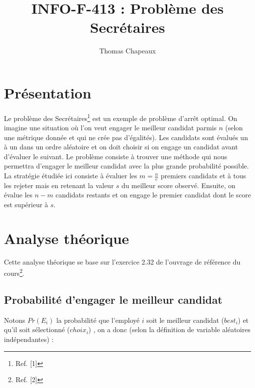 \documentclass[a4paper,10pt]{article}
\title{INFO-F-413 : Problème des Secrétaires}
\author{Thomas Chapeaux}
\begin{document}
\sloppy
\maketitle

\section{Présentation}

Le problème des Secrétaires\footnote{Ref. [1]} est un exemple de problème d'arrêt optimal. On imagine une situation où l'on veut engager
le meilleur candidat parmis
\begin{math}n\end{math}
(selon une métrique donnée et qui ne crée pas d'égalités). Les candidats sont évalués un à un dans un ordre aléatoire et on doit choisir si on engage un candidat
avant d'évaluer le suivant. Le problème consiste à trouver une méthode qui nous permettra d'engager le meilleur candidat avec
la plus grande probabilité possible.\\

La stratégie étudiée ici consiste à évaluer les
\begin{math}m = \frac{n}{e}\end{math}
premiers candidats et à tous les rejeter mais en retenant la valeur
\begin{math}s\end{math}
du meilleur score observé. Ensuite, on évalue les
\begin{math}n-m\end{math}
candidats restants et on engage le premier candidat dont le score est supérieur à
\begin{math}s\end{math}.\\

\section{Analyse théorique}
Cette analyse théorique se base sur l'exercice 2.32 de l'ouvrage de référence du cours\footnote{Ref. [2]}.
\subsection{Probabilité d'engager le meilleur candidat}
Notons
\begin{math}Pr(E_i)\end{math}
la probabilité que l'employé
\begin{math}i\end{math}
soit le meilleur candidat
(\begin{math}best_i\end{math})
et qu'il soit sélectionné
(\begin{math}choix_i\end{math})
, on a donc (selon la définition de variable aléatoires indépendantes) :\\
\end{document}
